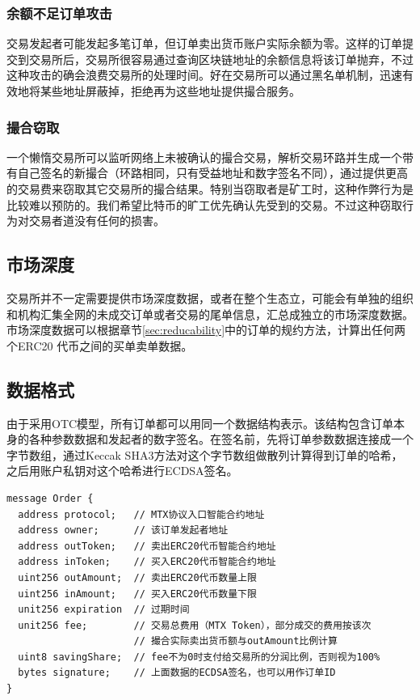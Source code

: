 \documentclass[UTF8,nofonts]{ctexart}
\begin{document}
\subsubsection{余额不足订单攻击}

交易发起者可能发起多笔订单，但订单卖出货币账户实际余额为零。这样的订单提交到交易所后，交易所很容易通过查询区块链地址的余额信息将该订单抛弃，不过这种攻击的确会浪费交易所的处理时间。好在交易所可以通过黑名单机制，迅速有效地将某些地址屏蔽掉，拒绝再为这些地址提供撮合服务。

\subsubsection{撮合窃取}

一个懒惰交易所可以监听网络上未被确认的撮合交易，解析交易环路并生成一个带有自己签名的新撮合（环路相同，只有受益地址和数字签名不同），通过提供更高的交易费来窃取其它交易所的撮合结果。特别当窃取者是矿工时，这种作弊行为是比较难以预防的。我们希望比特币的旷工优先确认先受到的交易。不过这种窃取行为对交易者道没有任何的损害。

\subsection{市场深度\label{sec:marketdepth}}

交易所并不一定需要提供市场深度数据，或者在整个生态立，可能会有单独的组织和机构汇集全网的未成交订单或者交易的尾单信息，汇总成独立的市场深度数据。市场深度数据可以根据章节\ref{sec:reducability}中的订单的规约方法，计算出任何两个ERC20 代币之间的买单卖单数据。

\subsection{数据格式\label{sec:dataformat}}

由于采用OTC模型，所有订单都可以用同一个数据结构表示。该结构包含订单本身的各种参数数据和发起者的数字签名。在签名前，先将订单参数数据连接成一个字节数组，通过Keccak SHA3方法对这个字节数组做散列计算得到订单的哈希，之后用账户私钥对这个哈希进行ECDSA签名。


\begin{verbatim}
message Order {
  address protocol;   // MTX协议入口智能合约地址
  address owner;      // 该订单发起者地址
  address outToken;   // 卖出ERC20代币智能合约地址
  address inToken;    // 买入ERC20代币智能合约地址
  uint256 outAmount;  // 卖出ERC20代币数量上限
  uint256 inAmount;   // 买入ERC20代币数量下限
  unit256 expiration  // 过期时间
  unit256 fee;        // 交易总费用（MTX Token），部分成交的费用按该次
                      // 撮合实际卖出货币额与outAmount比例计算
  uint8 savingShare;  // fee不为0时支付给交易所的分润比例，否则视为100%
  bytes signature;    // 上面数据的ECDSA签名，也可以用作订单ID
}	
\end{verbatim}
\end{document}
